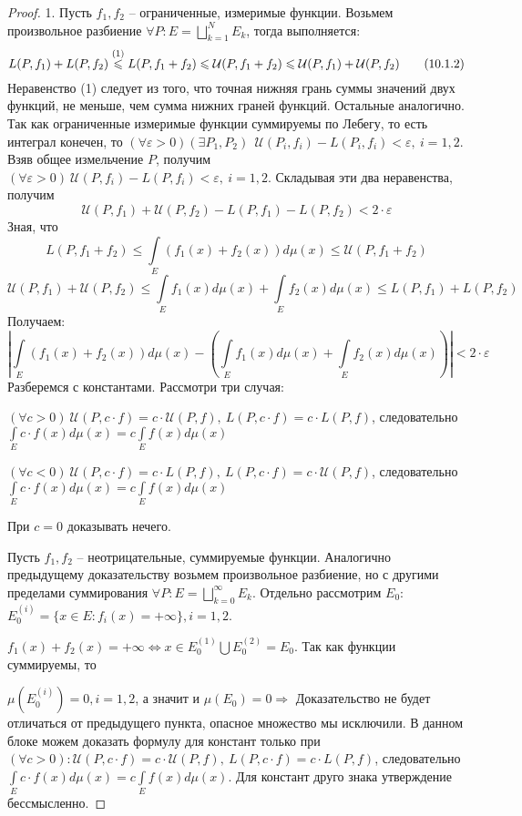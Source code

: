 \begin{proof}
 1. Пусть $f_1, f_2$ -- ограниченные, измеримые функции. Возьмем произвольное разбиение $\forall P: E=\bigsqcup\limits_{k=1}^N E_k$, тогда выполняется:
 \begin{equation}
 	L(P,f_1)+L(P,f_2)\overset{(1)}{\leqslant} L(P, f_1+f_2) \leqslant \mathcal{U}(P, f_1+f_2) \? \leqslant \mathcal{U}(P, f_1)+\mathcal{U}(P, f_2) \tag{10.1.2}\label{10.1.2} 
\end{equation}
Неравенство (1) следует из того, что точная нижняя грань суммы значений двух функций, не меньше, чем сумма нижних граней функций. Остальные аналогично. Так как ограниченные измеримые функции суммируемы по Лебегу, то есть интеграл конечен, то $(\forall \varepsilon >0)(\exists P_1, P_2)\ \ \mathcal{U}(P_i, f_i)-L(P_i, f_i)<\varepsilon,\ i = 1,2.$ Взяв общее измельчение $P$, получим $(\forall \varepsilon >0)\ \mathcal{U}(P, f_i)-L(P, f_i)<\varepsilon,\ i = 1,2.$ Складывая эти два неравенства, получим $$\mathcal{U}(P, f_1)+\mathcal{U}(P, f_2)-L(P,f_1)-L(P,f_2)<2\cdot\varepsilon$$
Зная, что 
$$L(P, f_1+f_2) \leqslant \int\limits_E(f_1(x)+f_2(x))d\mu(x) \leqslant \mathcal{U}(P, f_1+f_2)$$ 
$$\mathcal{U}(P, f_1)+\mathcal{U}(P, f_2)\leqslant \int\limits_Ef_1(x)d\mu(x)+\int\limits_E f_2(x)d\mu(x) \leqslant L(P,f_1)+L(P,f_2)$$
Получаем:
$$\left|\int\limits_E(f_1(x)+f_2(x))d\mu(x)-\left(\int\limits_Ef_1(x)d\mu(x)+\int\limits_E f_2(x)d\mu(x)\right)\right|<2\cdot\varepsilon$$
Разберемся с константами. Рассмотри три случая:

$(\forall c>0)\  \mathcal{U}(P, c\cdot f)=c\cdot \mathcal{U}(P, f),\ L(P, c\cdot f)=c\cdot L(P ,f)$, следовательно $\int\limits_{E}c\cdot f(x) d\mu (x) = c\int\limits_{E}f(x) d\mu (x)$

$(\forall c<0)\  \mathcal{U}(P, c\cdot f)=c\cdot L(P, f),\ L(P, c\cdot f)=c\cdot \mathcal{U}(P ,f)$, следовательно $\int\limits_{E}c\cdot f(x) d\mu (x) = c\int\limits_{E}f(x) d\mu (x)$

При $c = 0$ доказывать нечего.

Пусть $f_1, f_2$ -- неотрицательные, суммируемые функции.
Аналогично предыдущему доказательству возьмем произвольное разбиение, но с другими пределами суммирования $\forall P: E=\bigsqcup\limits_{k=0}^{\infty} E_k$. Отдельно рассмотрим $E_0$:
$E_0^{(i)} = \{x\in E: f_i(x)=+\infty\}, i = 1,2$.

$f_1(x)+f_2(x)=+\infty \Leftrightarrow x\in E_0^{(1)}\bigcup E_0^{(2)} = E_0$. Так как функции суммируемы, то 

$\mu(E_0^{(i)})=0, i = 1, 2$, а значит и $\mu(E_0) = 0 \Rightarrow$ Доказательство не будет отличаться от предыдущего пункта, опасное множество мы исключили. В данном блоке можем доказать формулу для констант только при $(\forall c>0): \mathcal{U}(P, c\cdot f)=c\cdot \mathcal{U}(P, f),\ L(P, c\cdot f)=c\cdot L(P ,f)$, следовательно
$\int\limits_{E}c\cdot f(x) d\mu (x) = c\int\limits_{E}f(x) d\mu (x)$. Для констант друго знака утверждение бессмысленно.


\end{proof}
